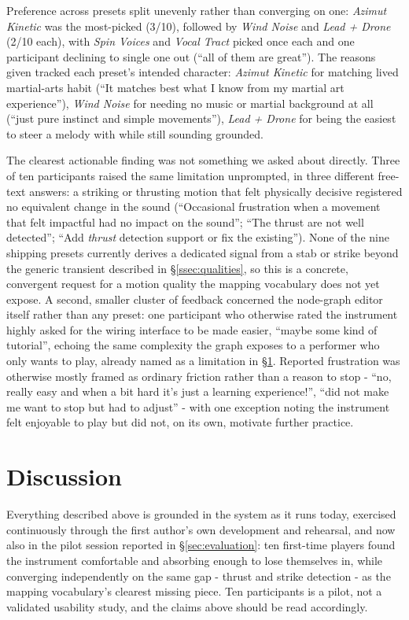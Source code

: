 \documentclass[a4paper,10pt,oneside]{article}
\newcommand{\preset}[1]{\textit{#1}}
\begin{document}
\begin{sloppy}
Preference across presets split unevenly rather than converging on one: \preset{Azimut
Kinetic} was the most-picked (3/10), followed by \preset{Wind Noise} and \preset{Lead +
Drone} (2/10 each), with \preset{Spin Voices} and \preset{Vocal Tract} picked once each and
one participant declining to single one out (``all of them are great''). The reasons given
tracked each preset's intended character: \preset{Azimut Kinetic} for matching lived
martial-arts habit (``It matches best what I know from my martial art experience''),
\preset{Wind Noise} for needing no music or martial background at all (``just pure
instinct and simple movements''), \preset{Lead + Drone} for being the easiest to steer a
melody with while still sounding grounded.

The clearest actionable finding was not something we asked about directly. Three of ten
participants raised the same limitation unprompted, in three different free-text answers:
a striking or thrusting motion that felt physically decisive registered no equivalent
change in the sound (``Occasional frustration when a movement that felt impactful had no
impact on the sound''; ``The thrust are not well detected''; ``Add \emph{thrust} detection
support or fix the existing''). None of the nine shipping presets currently derives a
dedicated signal from a stab or strike beyond the generic transient described in
\S\ref{ssec:qualities}, so this is a concrete, convergent request for a motion quality the
mapping vocabulary does not yet expose. A second, smaller cluster of feedback concerned the
node-graph editor itself rather than any preset: one participant who otherwise rated the
instrument highly asked for the wiring interface to be made easier, ``maybe some kind of
tutorial'', echoing the same complexity the graph exposes to a performer who only wants to
play, already named as a limitation in \S\ref{sec:discussion}. Reported frustration was
otherwise mostly framed as ordinary friction rather than a reason to stop - ``no, really
easy and when a bit hard it's just a learning experience!'', ``did not make me want to stop
but had to adjust'' - with one exception noting the instrument felt enjoyable to play but
did not, on its own, motivate further practice.

\section{Discussion}
\label{sec:discussion}

Everything described above is grounded in the system as it runs today, exercised
continuously through the first author's own development and rehearsal, and now also in
the pilot session reported in \S\ref{sec:evaluation}: ten first-time players found the
instrument comfortable and absorbing enough to lose themselves in, while converging
independently on the same gap - thrust and strike detection - as the mapping
vocabulary's clearest missing piece. Ten participants is a pilot, not a validated
usability study, and the claims above should be read accordingly.


\end{sloppy}
\end{document}
